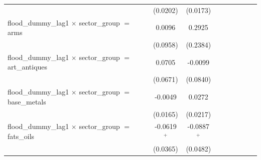 \begin{tabular}{lcccccccc}
                                                                                  & (0.0202)              & (0.0173)              &                       &                       &                       &                       &                       &   \\   
   flood\_dummy\_lag1 $\times$ sector\_group $=$ arms                             & 0.0096                & 0.2925                &                       &                       &                       &                       &                       &   \\   
                                                                                  & (0.0958)              & (0.2384)              &                       &                       &                       &                       &                       &   \\   
   flood\_dummy\_lag1 $\times$ sector\_group $=$ art\_antiques                    & 0.0705                & -0.0099               &                       &                       &                       &                       &                       &   \\   
                                                                                  & (0.0671)              & (0.0840)              &                       &                       &                       &                       &                       &   \\   
   flood\_dummy\_lag1 $\times$ sector\_group $=$ base\_metals                     & -0.0049               & 0.0272                &                       &                       &                       &                       &                       &   \\   
                                                                                  & (0.0165)              & (0.0217)              &                       &                       &                       &                       &                       &   \\   
   flood\_dummy\_lag1 $\times$ sector\_group $=$ fats\_oils                       & -0.0619$^{+}$         & -0.0887$^{+}$         &                       &                       &                       &                       &                       &   \\   
                                                                                  & (0.0365)              & (0.0482)              &                       &                       &                       &                       &                       &   \\   

\end{tabular}
